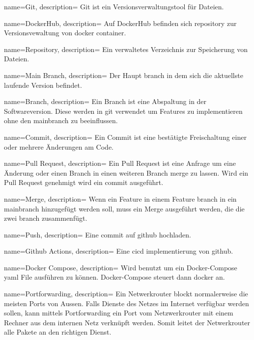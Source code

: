 {
	name=Git,
	description={
		Git ist ein Versionsverwaltungstool für Dateien.
	}
}

{
	name=DockerHub,
	description={
		Auf DockerHub befinden sich \gls{repository} zur Versionsvewaltung von \gls{docker} \gls{container}.
	}
}

{
	name=Repository,
	description={
		Ein verwaltetes Verzeichnis zur Speicherung von Dateien.
	}
}

{
	name=Main Branch,
	description={
		Der Haupt \gls{branch} in dem sich die aktuellste laufende Version befindet.
	}
}

{
	name=Branch,
	description={
		Ein Branch ist eine Abspaltung in der Softwareversion. Diese werden in \gls{git} verwendet um Features zu implementieren ohne den \gls{mainbranch} zu beeinflussen.
	}
}

{
	name=Commit,
	description={
		Ein Commit ist eine bestätigte Freischaltung einer oder mehrere Änderungen am Code.
	}
}

{
	name=Pull Request,
	description={
		Ein Pull Request ist eine Anfrage um eine Änderung oder einen Branch in einen weiteren Branch \gls{merge} zu lassen. Wird ein Pull Request genehmigt wird ein \gls{commit} ausgeführt.
	}
}

{
	name=Merge,
	description={
		Wenn ein Feature in einem Feature \gls{branch} in ein \gls{mainbranch} hinzugefügt werden soll, muss ein Merge ausgeführt werden, die die zwei \gls{branch} zusammenfügt.
	}
}

{
	name=Push,
	description={
		Eine \gls{commit} auf \gls{github} hochladen.
	}
}

{
	name=Github Actions,
	description={
		Eine \gls{cicd} implementierung von \gls{github}.
	}
}

{
	name=Docker Compose,
	description={
		Wird benutzt um ein Docker-Compose \gls{yaml} File ausführen zu können. Docker-Compose steuert dann \gls{docker} an.
	}
}

{
	name=Portforwarding,
	description={
		Ein Netwerkrouter blockt normalerweise die meisten Ports von Aussen. Falls Dienste des Netzes im Internet verfügbar werden sollen, kann mittels Portforwarding ein Port vom Netzwerkrouter mit einem Rechner aus dem internen Netz verknüpft werden. Somit leitet der Netwerkrouter alle Pakete an den richtigen Dienst.
	}
}

